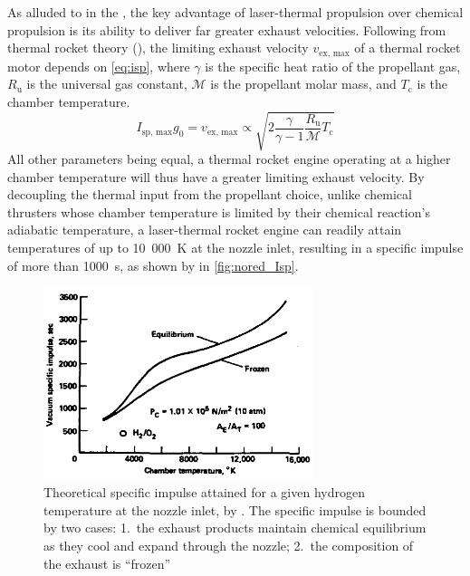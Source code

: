         As alluded to in the , the key advantage of laser-thermal propulsion over chemical propulsion is its ability to deliver far greater exhaust velocities. Following from thermal rocket theory (\textcite{zandbergenAE4S01ThermalRocket2020}), the limiting exhaust velocity $v_\text{ex, max}$ of a thermal rocket motor depends on \autoref{eq:isp}, where $\gamma$ is the specific heat ratio of the propellant gas, $R_\text{u}$ is the universal gas constant, $\mathcal{M}$ is the propellant molar mass, and $T_\text{c}$ is the chamber temperature.
        \begin{equation}
            I_\text{sp, max}g_0 = v_\text{ex, max} \propto \sqrt{2\frac{\gamma}{\gamma-1}\frac{R_\text{u}}{\mathcal{M}}T_\text{c}} \label{eq:isp}
        \end{equation}
        All other parameters being equal, a thermal rocket engine operating at a higher chamber temperature will thus have a greater limiting exhaust velocity. By decoupling the thermal input from the propellant choice, unlike chemical thrusters whose chamber temperature is limited by their chemical reaction's adiabatic temperature, a laser-thermal rocket engine can readily attain temperatures of up to 10~000~K at the nozzle inlet, resulting in a specific impulse of more than 1000~s, as shown by \textcite{noredApplicationHighPower1976} in \autoref{fig:nored_Isp}.

        \begin{figure}[h]
            \centering
            \includegraphics[width=0.7\textwidth]{assets/2 background/nored_ltpIsp.png}
            \caption[Theoretical specific impulse attained for a given hydrogen temperature]{Theoretical specific impulse attained for a given hydrogen temperature at the nozzle inlet, by \textcite{noredApplicationHighPower1976}. The specific impulse is bounded by two cases: 1.~the exhaust products maintain chemical equilibrium as they cool and expand through the nozzle; 2.~the composition of the exhaust is ``frozen''}
            \label{fig:nored_Isp}
        \end{figure}

